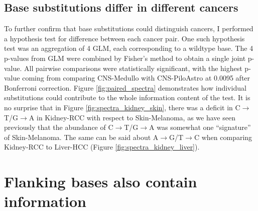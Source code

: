 

\subsection{Base substitutions differ in different cancers}
To further confirm that base substitutions could distinguish cancers, I performed a hypothesis test for difference between each cancer pair. One such hypothesis test was an aggregation of 4 GLM, each corresponding to a wildtype base. The 4 p-values from GLM were combined by Fisher's method to obtain a single joint p-value. All pairwise comparisons were statistically significant, with the highest p-value coming from comparing CNS-Medullo with CNS-PiloAstro at 0.0095 after Bonferroni correction. Figure \ref{fig:paired_spectra} demonstrates how individual substitutions could contribute to the whole information content of the test. It is no surprise that in Figure \ref{fig:spectra_kidney_skin}, there was a deficit in C$\rightarrow$T/G$\rightarrow$A in Kidney-RCC with respect to Skin-Melanoma, as we have seen previously that the abundance of C$\rightarrow$T/G$\rightarrow$A was somewhat one ``signature'' of Skin-Melanoma. The same can be said about A$\rightarrow$G/T$\rightarrow$C when comparing Kidney-RCC to Liver-HCC (Figure \ref{fig:spectra_kidney_liver}).



\section{Flanking bases also contain information}